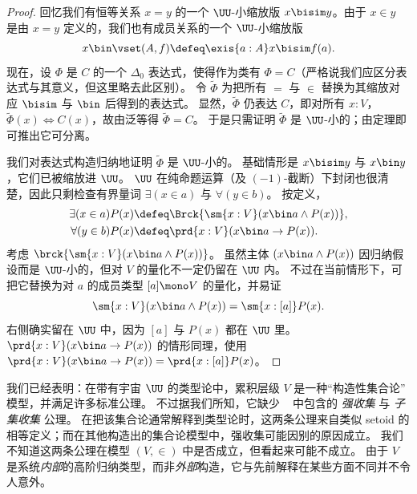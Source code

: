 \begin{proof}
回忆我们有恒等关系 $x = y$ 的一个 $\UU$-小缩放版 $x \bisim y$。由于 $x\in y$ 是由 $x=y$ 定义的，我们也有成员关系的一个 $\UU$-小缩放版
%
\begin{equation*}
  x\bin\vset(A,f) \defeq \exis{a:A} x \bisim f(a).
\end{equation*}
%
现在，设 $\Phi$ 是 $C$ 的一个 $\Delta_0$ 表达式，使得作为类有 $\Phi = C$（严格说我们应区分表达式与其意义，但这里略去此区别）。
令 $\widetilde{\Phi}$ 为把所有 $=$ 与 $\in$ 替换为其缩放对应 $\bisim$ 与 $\bin$ 后得到的表达式。
显然，$\widetilde{\Phi}$ 仍表达 $C$，即对所有 $x:V$，$\widetilde{\Phi}(x) \Leftrightarrow C(x)$，故由泛等得 $\widetilde{\Phi}=C$。
于是只需证明 $\widetilde{\Phi}$ 是 $\UU$-小的；由定理即可推出它可分离。

我们对表达式构造归纳地证明 $\widetilde{\Phi}$ 是 $\UU$-小的。
基础情形是 $x \bisim y$ 与 $x\bin y$，它们已被缩放进 $\UU$。
$\UU$ 在纯命题运算（及 $(-1)$-截断）下封闭也很清楚，因此只剩检查有界量词 $\exists(x\in a)$ 与 $\forall(y\in b)$。
按定义，
\begin{align*}
\exists(x\in a) P(x) &\defeq \Brck {\sm{x:V}(x\bin a \land P(x))},\\
\forall(y\in b) P(x) &\defeq  \prd{x:V}(x\bin a \to P(x)).
\end{align*}
考虑 $\brck {\sm{x:V}(x\bin a \land P(x))}$。
虽然主体 $(x\bin a \land P(x))$ 因归纳假设而是 $\UU$-小的，但对 $V$ 的量化不一定仍留在 $\UU$ 内。
不过在当前情形下，可把它替换为对 $a$ 的成员类型 $[a]\mono V$ 的量化，并易证
\begin{equation*}
  \sm{x:V}(x\bin a \land P(x)) = \sm{x:[a]} P(x).
\end{equation*}
右侧确实留在 $\UU$ 中，因为 $[a]$ 与 $P(x)$ 都在 $\UU$ 里。
$\prd{x:V}(x\bin a \to P(x))$ 的情形同理，使用 $\prd{x:V}(x\bin a \to P(x)) = \prd{x:[a]}P(x)$。
\end{proof}

我们已经表明：在带有宇宙 $\UU$ 的类型论中，累积层级 $V$ 是一种“构造性集合论”
%
模型，并满足许多标准公理。
不过据我们所知，它缺少 \CZF{}~\cite{AczelCZF} 中包含的
\emph{强收集}
%
%
%
与 \emph{子集收集}
%
%
%
公理。
在把该集合论通常解释到类型论时，这两条公理来自类似 setoid 的相等定义；而在其他构造出的集合论模型中，强收集可能因别的原因成立。
我们不知道这两条公理在模型 $(V,\in)$ 中是否成立，但看起来可能不成立。
由于 $V$ 是系统\emph{内部}的高阶归纳类型，而非\emph{外部}构造，它与先前解释在某些方面不同并不令人意外。

